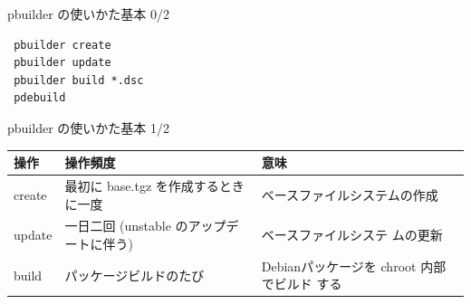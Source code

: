 \documentclass[cjk,dvipdfmx,12pt]{beamer}
\begin{document}
\begin{frame}[containsverbatim]{pbuilder の使いかた基本 0/2}
  \begin{verbatim}
 pbuilder create 
 pbuilder update
 pbuilder build *.dsc
 pdebuild 
 \end{verbatim}
\end{frame}

\begin{frame}{pbuilder の使いかた基本 1/2}
\begin{tabular}{|l|p{8em}|p{8em}|}
\hline
操作 & 操作頻度 & 意味 \\
\hline
create & 最初に base.tgz を作成するときに一度 & ベースファイルシステムの作成 \\
update & 一日二回 (unstable のアップデートに伴う) & ベースファイルシステ
 ムの更新 \\
build & パッケージビルドのたび & Debianパッケージを chroot 内部でビルド
 する \\
\hline
\end{tabular}
\end{frame}
\end{document}
